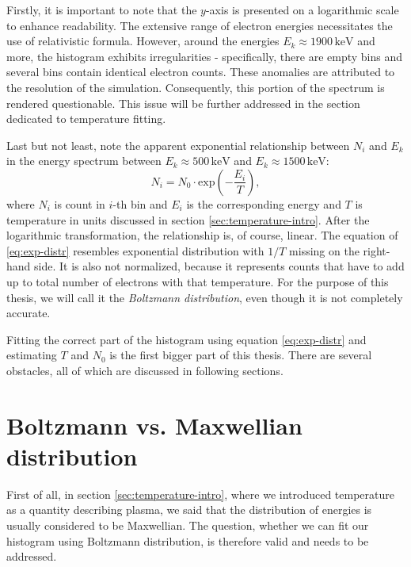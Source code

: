 Firstly, it is important to note that the $y$-axis is presented on a logarithmic scale to enhance readability. The extensive range of electron energies necessitates the use of relativistic formula. However, around the energies $E_k \approx 1900 \, \mathrm{keV}$ and more, the histogram exhibits irregularities - specifically, there are empty bins and several bins contain identical electron counts. These anomalies are attributed to the resolution of the simulation. Consequently, this portion of the spectrum is rendered questionable. This issue will be further addressed in the section dedicated to temperature fitting.

Last but not least, note the apparent exponential relationship between $N_i$ and $E_k$ in the energy spectrum between $E_k \approx 500 \, \mathrm{keV}$ and $E_k \approx 1500 \, \mathrm{keV}$:
\begin{equation}
	\label{eq:exp-distr}
	N_i = N_0 \cdot \mathrm{exp}\left( -\frac{E_i}{T}\right)\mathrm{,}
\end{equation}
where $N_i$ is count in $i$-th bin and $E_i$ is the corresponding energy and $T$ is temperature in units discussed in section \ref{sec:temperature-intro}. After the logarithmic transformation, the relationship is, of course, linear. The equation of \ref{eq:exp-distr} resembles exponential distribution with $1/T$ missing on the right-hand side. It is also not normalized, because it represents counts that have to add up to total number of electrons with that temperature. For the purpose of this thesis, we will call it the \textit{Boltzmann distribution}, even though it is not completely accurate.

Fitting the correct part of the histogram using equation \ref{eq:exp-distr} and estimating $T$ and $N_0$ is the first bigger part of this thesis. There are several obstacles, all of which are discussed in following sections.

\section{Boltzmann vs. Maxwellian distribution}
First of all, in section \ref{sec:temperature-intro}, where we introduced temperature as a quantity describing plasma, we said that the distribution of energies is usually considered to be Maxwellian. The question, whether we can fit our histogram using Boltzmann distribution, is therefore valid and needs to be addressed.

